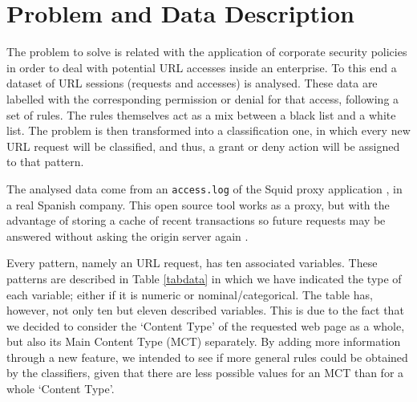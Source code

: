 \documentclass{llncs}
\begin{document}
\section{Problem and Data Description}
\label{sec:problemDescription}

\noindent The problem to solve is related with the application of corporate security policies in order to deal with potential URL accesses inside an enterprise. To this end a dataset of URL sessions (requests and accesses) is analysed. These data are labelled with the corresponding permission or denial for that access, following a set of rules. The rules themselves act as a mix between a black list and a white list. The problem is then transformed into a classification one, in which every new URL request will be classified, and thus, a grant or deny action will be assigned to that pattern.

The analysed data come from an \texttt{access.log} of the Squid proxy application \cite{squid:site}, in a real Spanish company. This open source tool works as a proxy, but with the advantage of storing a cache of recent transactions so future requests may be answered without asking the origin server again \cite{DuaneWessels2004}.  

Every pattern, namely an URL request, has ten associated variables. These patterns are described in Table \ref{tabdata} in which we have indicated the type of  each variable; either if it is numeric or nominal/categorical. The table has, however, not only ten but eleven described variables. This is due to the fact that we decided to consider the `Content Type' of the requested web page as a whole, but also its Main Content Type (MCT) separately. By adding more information through a new feature, we intended to see if more general rules could be obtained by the classifiers, given that there are less possible values for an MCT than for a whole `Content Type'.

 
\end{document}
